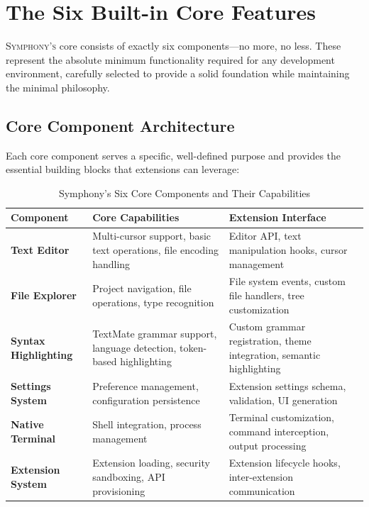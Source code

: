 
\section*{The Six Built-in Core Features}

\lettrine{S}{ymphony's} core consists of exactly six components—no more, no less. These represent the absolute minimum functionality required for any development environment, carefully selected to provide a solid foundation while maintaining the minimal philosophy.

\subsection*{Core Component Architecture}

Each core component serves a specific, well-defined purpose and provides the essential building blocks that extensions can leverage:

\begin{table}[ht]
\centering
\begin{tabular}{@{}p{}p{}p{}@{}}
\toprule
\textbf{Component} & \textbf{Core Capabilities} & \textbf{Extension Interface} \\
\midrule
\textbf{Text Editor} & 
Multi-cursor support, basic text operations, file encoding handling & 
Editor API, text manipulation hooks, cursor management \\
\midrule
\textbf{File Explorer} & 
Project navigation, file operations, type recognition & 
File system events, custom file handlers, tree customization \\
\midrule
\textbf{Syntax Highlighting} & 
TextMate grammar support, language detection, token-based highlighting & 
Custom grammar registration, theme integration, semantic highlighting \\
\midrule
\textbf{Settings System} & 
Preference management, configuration persistence & 
Extension settings schema, validation, UI generation \\
\midrule
\textbf{Native Terminal} & 
Shell integration, process management & 
Terminal customization, command interception, output processing \\
\midrule
\textbf{Extension System} & 
Extension loading, security sandboxing, API provisioning & 
Extension lifecycle hooks, inter-extension communication \\
\bottomrule
\end{tabular}
\caption{Symphony's Six Core Components and Their Capabilities}
\end{table}


